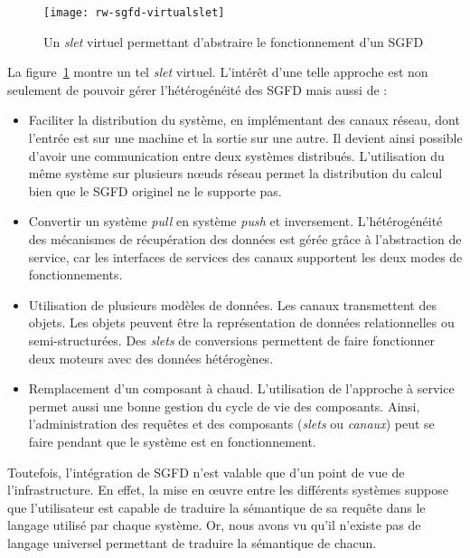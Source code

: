 \begin{figure}[ht]
    \centering
    \texttt{[image: rw-sgfd-virtualslet]}
    \caption{Un \textit{slet} virtuel permettant d'abstraire le fonctionnement d'un SGFD}\label{fig:rw:sgfd:virtualslet}
\end{figure}
La figure~\ref{fig:rw:sgfd:virtualslet} montre un tel \textit{slet} virtuel. L'intérêt d'une telle approche est non seulement de pouvoir gérer l'hétérogénéité des SGFD mais aussi de :
\begin{itemize}
	\item Faciliter la distribution du système, en implémentant des canaux réseau, dont l'entrée est sur une machine et la sortie sur une autre. Il devient ainsi possible d'avoir une communication entre deux systèmes distribués. L'utilisation du même système sur plusieurs nœuds réseau permet la distribution du calcul bien que le SGFD originel ne le supporte pas.
	\item Convertir un système \textit{pull} en système \textit{push} et inversement. L'hétérogénéité des mécanismes de récupération des données est gérée grâce à l'abstraction de service, car les interfaces de services des canaux supportent les deux modes de fonctionnements.
	\item Utilisation de plusieurs modèles de données. Les canaux transmettent des objets. Les objets peuvent être la représentation de données relationnelles ou semi-structurées. Des \textit{slets} de conversions permettent de faire fonctionner deux moteurs avec des données hétérogènes.
	\item Remplacement d'un composant à chaud. L'utilisation de l'approche à service permet aussi une bonne gestion du cycle de vie des composants. Ainsi, l'administration des requêtes et des composants (\textit{slets} ou \textit{canaux}) peut se faire pendant que le système est en fonctionnement.
\end{itemize}

Toutefois, l'intégration de SGFD n'est valable que d'un point de vue de l'infrastructure. En effet, la mise en œuvre entre les différents systèmes suppose que l'utilisateur est capable de traduire la sémantique de sa requête dans le langage utilisé par chaque système. Or, nous avons vu qu'il n'existe pas de langage universel permettant de traduire la sémantique de chacun.
